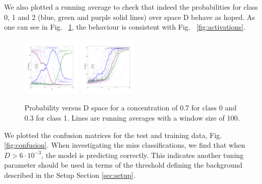 \documentclass{article}
\begin{document}
%
We also plotted a running average to check that indeed the probabilities for class 0, 1 and 2 (blue, green and purple solid lines) over space D behave as hoped. As one can see in Fig. ~\ref{fig:Dspace}, the behaviour is consistent with Fig. ~\ref{fig:activations}.
%
\begin{figure}[H]
	\centering
	\includegraphics[width=0.25\textwidth]{DNN_D_vs_prob_6_2.png} \hspace*{-.5cm}
	\includegraphics[width=0.25\textwidth]{DNN_D_vs_act_6.png}	
	\caption{Probability versus D space for a concentration of 0.7 for class 0 and 0.3 for class 1. Lines are running averages with a window size of 100.}
	\label{fig:Dspace}
\end{figure}
%
We plotted the confusion matrices for the test and training data, Fig. \ref{fig:confusion}. When investigating the miss classifications, we find that when $D > 6\cdot 10^{-3}$, the model is predicting correctly. This indicates another tuning parameter should be used in terms of the threshold defining the background described in the Setup Section \ref{sec:setup}.


\end{document}
